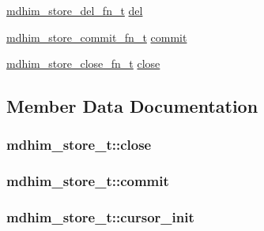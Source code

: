 \begin{DoxyCompactItemize}
\item 
\hyperlink{data__store_8h_aabc5c9879c73c85349c660530f687f52}{mdhim\-\_\-store\-\_\-del\-\_\-fn\-\_\-t} \hyperlink{structmdhim__store__t_a3cf5374069e55121b50e4567a1e5e2e1}{del}
\item 
\hyperlink{data__store_8h_acbf72a3c5eaa36c296d1ecf18ab6e1ed}{mdhim\-\_\-store\-\_\-commit\-\_\-fn\-\_\-t} \hyperlink{structmdhim__store__t_ae67ea767684de68875b9bfda9cdb8c08}{commit}
\item 
\hyperlink{data__store_8h_ab4037e75447b1b75d7cea3555024aa74}{mdhim\-\_\-store\-\_\-close\-\_\-fn\-\_\-t} \hyperlink{structmdhim__store__t_a41daefe3effd7441930c4296fb6002de}{close}
\end{DoxyCompactItemize}


\subsection{Member Data Documentation}
\hypertarget{structmdhim__store__t_a41daefe3effd7441930c4296fb6002de}{
\subsubsection[{close}]{ mdhim\-\_\-store\-\_\-t\-::close}}\label{d1/dab/structmdhim__store__t_a41daefe3effd7441930c4296fb6002de}
\hypertarget{structmdhim__store__t_ae67ea767684de68875b9bfda9cdb8c08}{
\subsubsection[{commit}]{ mdhim\-\_\-store\-\_\-t\-::commit}}\label{d1/dab/structmdhim__store__t_ae67ea767684de68875b9bfda9cdb8c08}
\hypertarget{structmdhim__store__t_ade2a566d298ab48a666cf2cfdec58f25}{
\subsubsection[{cursor\-\_\-init}]{ mdhim\-\_\-store\-\_\-t\-::cursor\-\_\-init}}\label{d1/dab/structmdhim__store__t_ade2a566d298ab48a666cf2cfdec58f25}
